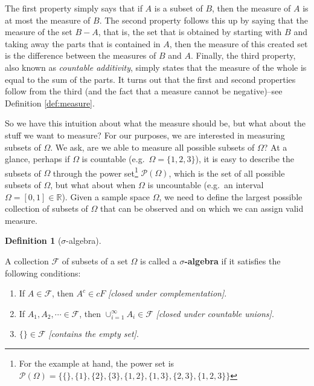 \documentclass[
]{book}
\providecommand{\tightlist}{%
  \setlength{\itemsep}{0pt}\setlength{\parskip}{0pt}}
\newcommand{\bbR}{\mathbb{R}}
\newcommand{\cF}{{\mathcal F}}
\newcommand{\cP}{{\mathcal P}}
\theoremstyle{definition}
\newtheorem{definition}{Definition}[chapter]
\theoremstyle{definition}
\theoremstyle{definition}
\theoremstyle{definition}
\theoremstyle{remark}
\begin{document}
The first property simply says that if \(A\) is a subset of \(B\), then the measure of \(A\) is at most the measure of \(B\).
The second property follows this up by saying that the measure of the set \(B-A\), that is, the set that is obtained by starting with \(B\) and taking away the parts that is contained in \(A\), then the measure of this created set is the difference between the measures of \(B\) and \(A\).
Finally, the third property, also known as \emph{countable additivity}, simply states that the measure of the whole is equal to the sum of the parts.
It turns out that the first and second properties follow from the third (and the fact that a measure cannot be negative)--see Definition \ref{def:measure}.

So we have this intuition about what the measure should be, but what about the stuff we want to measure?
For our purposes, we are interested in measuring subsets of \(\Omega\).
We ask, are we able to measure all possible subsets of \(\Omega\)?
At a glance, perhaps if \(\Omega\) is countable (e.g.~\(\Omega=\{1,2,3\}\)), it is easy to describe the subsets of \(\Omega\) through the power set\footnote{For the example at hand, the power set is \(\cP(\Omega)=\{ \{\}, \{1\}, \{2\}, \{3\}, \{1,2\}, \{1,3\}, \{2,3\}, \{1,2,3\} \}\)} \(\cP(\Omega)\), which is the set of all possible subsets of \(\Omega\), but what about when \(\Omega\) is uncountable (e.g.~an interval \(\Omega=[0,1]\in\bbR\)).
Given a sample space \(\Omega\), we need to define the largest possible collection of subsets of \(\Omega\) that can be observed and on which we can assign valid measure.

\begin{definition}[\(\sigma\)-algebra]
\protect\hypertarget{def:sigmaalgebra}{}\label{def:sigmaalgebra}

A collection \(\cF\) of subsets of a set \(\Omega\) is called a \textbf{\(\sigma\)-algebra} if it satisfies the following conditions:

\begin{enumerate}
\def\labelenumi{\roman{enumi}.}
\tightlist
\item
  If \(A \in \cF\), then \(A^c \in cF\) \emph{{[}closed under complementation{]}}.
\item
  If \(A_1,A_2,\cdots \in \cF\), then \(\cup_{i=1}^\infty A_i \in \cF\) \emph{{[}closed under countable unions{]}}.
\item
  \(\{\} \in \cF\) \emph{{[}contains the empty set{]}}.
\end{enumerate}

\end{definition}
\end{document}
